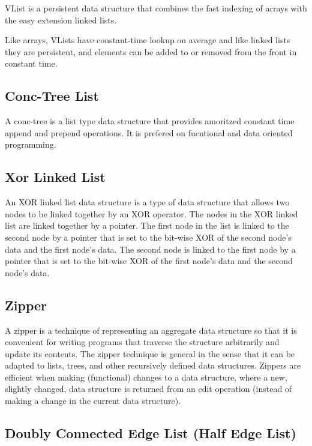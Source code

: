 \documentclass{book}
\begin{document}
    VList is a persistent data structure that combines the fast indexing of arrays with the easy extension linked lists.

    \noindent Like arrays, VLists have constant-time lookup on average and like linked lists they are persistent, and elements can be added to or removed from the front in constant time.

\subsection{Conc-Tree List}

A conc-tree is a list type data structure that provides amoritzed constant time append and prepend operations. It is prefered on fucntional and data oriented programming.

\subsection{Xor Linked List}

    An XOR linked list data structure is a type of data structure that allows two nodes to be linked together by an XOR operator. The nodes in the XOR linked list are linked together by a pointer. The first node in the list is linked to the second node by a pointer that is set to the bit-wise XOR of the second node's data and the first node's data. The second node is linked to the first node by a pointer that is set to the bit-wise XOR of the first node's data and the second node's data.

\subsection{Zipper}

A zipper is a technique of representing an aggregate data structure so that it is convenient for writing programs that traverse the structure arbitrarily and update its contents. The zipper technique is general in the sense that it can be adapted to lists, trees, and other recursively defined data structures. Zippers are efficient when making (functional) changes to a data structure, where a new, slightly changed, data structure is returned from an edit operation (instead of making a change in the current data structure).

\subsection{Doubly Connected Edge List (Half Edge List)}
\end{document}
